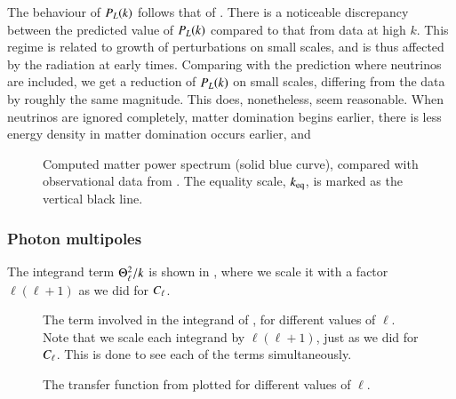 The behaviour of $P_L(k)$ follows that of . There is a noticeable discrepancy between the predicted value of $P_L(k)$ compared to that from data at high $k$. This regime is related to growth of perturbations on small scales, and is thus affected by the radiation at early times. Comparing with the prediction where neutrinos are included, we get a reduction of $P_L(k)$ on small scales, differing from the data by roughly the same magnitude. This does, nonetheless, seem reasonable. When neutrinos are ignored completely, matter domination begins earlier, there is less energy density in matter domination occurs earlier, and 
\begin{figure}[ht!]
    \caption{Computed matter power spectrum (solid blue curve), compared with observational data from . The equality scale, $k_\mathrm{eq}$, is marked as the vertical black line.}
    \label{fig:M4:results:matterPS_nk2000Neff}
\end{figure}





\subsubsection{Photon multipoles} \label{sssec:M4:results:photons_multipoles}
The integrand term $\Theta_\ell^2/k$ is shown in , where we scale it with a factor $\ell(\ell+1)$ as we did for $C_\ell$. 
\begin{figure}[ht!]
    \caption{The term involved in the integrand of , for different values of $\ell$. Note that we scale each integrand by $\ell(\ell+1)$, just as we did for $C_\ell$. This is done to see each of the terms simultaneously.}
    \label{fig:M4:results:integrand_thetas}
\end{figure}


\begin{figure}[ht!]
    \caption{The transfer function from  plotted for different values of $\ell$.}
    \label{fig:M4:results:thetas}
\end{figure}